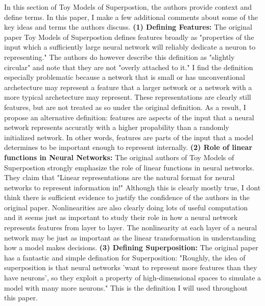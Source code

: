 \documentclass{article} %
\begin{document}
In this section of Toy Models of Superpostion\cite{elhage2022toy}, the authors
provide context and define terms.  In this paper, I make a few additional comments 
about some of the key ideas and terms the authors discuss. \newline \newline
\textbf{(1) Defining Features: }The original paper Toy Models of Superpostion
defines features broadly as "properties of the input which a sufficiently large 
neural network will reliably dedicate a neuron to representing." The authors do
however describe this definition as "slightly circular" and note that they are
not "overly attached to it." I find the definition especially problematic because a network that is small or
has unconventional archetecture may represent a feature that a larger network
or a network with a more typical archetecture may represent. These 
representations are clearly still features, but are not treated as so under the
original definition.\newline\newline
As a result, I propose an alternative definition: features are aspects of the
input that a neural network represents accuratly with a higher propability than 
a randomly initialized network. In other words, features are parts of the input 
that a model determines to be important enough to represent internally.\newline\newline
\textbf{(2) Role of linear functions in Neural Networks: }The original authors of
Toy Models of Superpostion strongly emphasize the role of linear functions in
neural networks. They claim that "Linear representations are the natural format 
for neural networks to represent information in!" Although this is clearly 
mostly true, I dont think there is sufficient evidence to justify the confidence 
of the authors in the original paper. Nonlinearities are also clearly doing lots 
of useful computation and it seems just as important to study their role in how 
a neural network represents features from layer to layer. The nonlinearity at 
each layer of a neural network may be just as important as the linear 
transformation in understanding how a model makes decisions.\newline\newline
\textbf{(3) Defining Superposition: } The original paper has a fantastic and
simple defination for Superposition: "Roughly, the idea of 
superposition is that neural networks 'want to represent more features than they 
have neurons', so they exploit a property of high-dimensional spaces to 
simulate a model with many more neurons." This is the definition I will used
throughout this paper.
\end{document}
